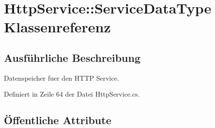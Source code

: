 \hypertarget{classQbeSAS_1_1HttpService_1_1ServiceDataType}{
\section{Http\-Service::Service\-Data\-Type Klassenreferenz}
\label{classQbeSAS_1_1HttpService_1_1ServiceDataType}
}


\subsection{Ausf\"{u}hrliche Beschreibung}
Datenspeicher fuer den HTTP Service. 



Definiert in Zeile 64 der Datei Http\-Service.cs.\subsection*{\"{O}ffentliche Attribute}
